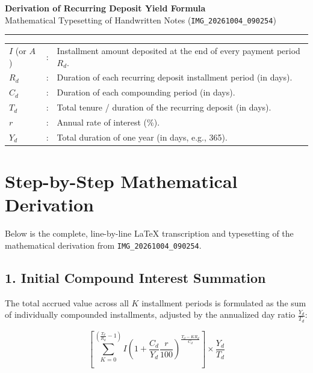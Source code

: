 \documentclass[11pt,a4paper]{article}
\begin{document}
\begin{center}
    {\LARGE \bfseries \color{primary} Derivation of Recurring Deposit Yield Formula}\\[0.5em]
    {\large \color{secondary} Mathematical Typesetting of Handwritten Notes (\texttt{IMG\_20261004\_090254})}\\[0.3em]
    \rule{\textwidth}{1pt}
\end{center}

\vspace{1em}

\begin{tcolorbox}[colback=bglight,colframe=secondary,title=\textbf{Notation \& Variables}]
\begin{tabular}{lll}
$I$ (or $A$) & : & Installment amount deposited at the end of every payment period $R_d$.\\[0.3em]
$R_d$ & : & Duration of each recurring deposit installment period (in days).\\[0.3em]
$C_d$ & : & Duration of each compounding period (in days).\\[0.3em]
$T_d$ & : & Total tenure / duration of the recurring deposit (in days).\\[0.3em]
$r$ & : & Annual rate of interest (\%).\\[0.3em]
$Y_d$ & : & Total duration of one year (in days, e.g., 365).
\end{tabular}
\end{tcolorbox}

\vspace{1.5em}

\section*{Step-by-Step Mathematical Derivation}

Below is the complete, line-by-line LaTeX transcription and typesetting of the mathematical derivation from \texttt{IMG\_20261004\_090254}.

\subsection*{1. Initial Compound Interest Summation}
The total accrued value across all $K$ installment periods is formulated as the sum of individually compounded installments, adjusted by the annualized day ratio $\frac{Y_d}{T_d}$:

\begin{equation}
\left[ \sum_{K=0}^{\left(\frac{T_d}{R_d}-1\right)} I \left(1 + \frac{C_d}{Y_d} \frac{r}{100}\right)^{\frac{T_d - K R_d}{C_d}} \right] \times \frac{Y_d}{T_d}
\end{equation}
\end{document}
